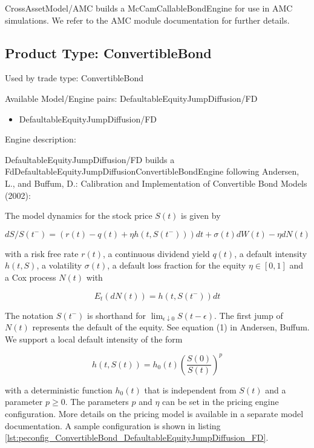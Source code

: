 CrossAssetModel/AMC builds a McCamCallableBondEngine for use in AMC simulations. We refer to the AMC module documentation for further
details.

\subsection{Product Type: ConvertibleBond}

Used by trade type: ConvertibleBond

Available Model/Engine pairs: DefaultableEquityJumpDiffusion/FD

\begin{itemize}
\item DefaultableEquityJumpDiffusion/FD
\end{itemize}

Engine description:

DefaultableEquityJumpDiffusion/FD builds a FdDefaultableEquityJumpDiffusionConvertibleBondEngine following Andersen, L.,
and Buffum, D.: Calibration and Implementation of Convertible Bond Models (2002):

The model dynamics for the stock price $S(t)$ is given by

\begin{equation}
  dS / S(t^-) = (r(t) - q(t) + \eta h(t, S(t^-))) dt + \sigma(t) dW(t) - \eta dN(t)
\end{equation}

with a risk free rate $r(t)$, a continuous dividend yield $q(t)$, a default intensity $h(t,S)$, a volatility
$\sigma(t)$, a default loss fraction for the equity $\eta \in [0,1]$ and a Cox process $N(t)$ with

\begin{equation}
  E_t(dN(t)) = h(t,S(t^-)) dt
\end{equation}

The notation $S(t^-)$ is shorthand for $\lim_{\epsilon\downarrow 0} S(t-\epsilon)$. The first jump of $N(t)$ represents
the default of the equity. See equation (1) in Andersen, Buffum. We support a local default intensity of the form

\begin{equation}
h(t,S(t)) = h_0(t) \left( \frac{S(0)}{S(t)} \right)^p
\end{equation}

with a deterministic function $h_0(t)$ that is independent from $S(t)$ and a parameter $p \geq 0$. The parameters $p$
and $\eta$ can be set in the pricing engine configuration. More details on the pricing model is available in a separate
model documentation. A sample configuration is shown in listing
\ref{lst:peconfig_ConvertibleBond_DefaultableEquityJumpDiffusion_FD}.

